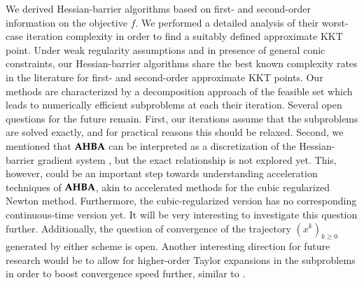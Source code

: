 %

We derived Hessian-barrier algorithms based on first- and second-order information on the objective $f$. We performed a detailed analysis of their worst-case iteration complexity in order to find a suitably defined approximate KKT point. Under weak regularity assumptions and in presence of general conic constraints, our Hessian-barrier algorithms share the best known complexity rates in the literature for first- and second-order  approximate KKT points. Our methods are characterized by a decomposition approach of the feasible set which leads to numerically efficient subproblems at each their iteration. Several open questions for the future remain. First, our iterations assume that the subproblems are solved exactly, and for practical reasons this should be relaxed. Second, we mentioned that $\operatorname{\mathbf{AHBA}}$ can be interpreted as a discretization of the Hessian-barrier gradient system \cite{ABB04}, but the exact relationship is not explored yet. This, however, could be an important step towards understanding acceleration techniques of $\operatorname{\mathbf{AHBA}}$, akin to accelerated methods for the cubic regularized Newton method. Furthermore, the cubic-regularized version has no corresponding continuous-time version yet. It will be very interesting to investigate this question further. Additionally, the question of convergence of the trajectory $(x^{k})_{k\geq 0}$ generated by either scheme is open. Another interesting direction for future research would be to allow for  higher-order Taylor expansions in the subproblems in order to boost convergence speed further, similar to \cite{CarGouToi19}. 